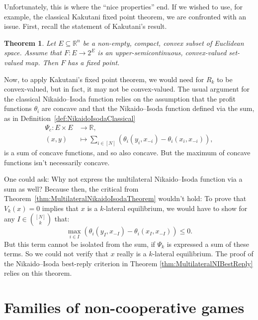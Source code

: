 \documentclass[a4paper,11pt,reqno,english]{amsart}
\theoremstyle{plain}
\newtheorem{theorem}{Theorem}[section]
\theoremstyle{definition}
\begin{document}
\medskip
Unfortunately, this is where the ``nice properties'' end.
If we wished to use, for example, the classical Kakutani fixed point theorem, we are confronted with an issue.
First, recall the statement of Kakutani's result.

\begin{theorem}\label{thm:KakutaniFixedPointTheorem}
	Let $E\subseteq \mathbb{R}^n$ be a non-empty, compact, convex subset of Euclidean space. Assume that $F\colon E\longrightarrow 2^E$ is an upper-semicontinuous, convex-valued set-valued map. Then $F$ has a fixed point.
\end{theorem}

Now, to apply Kakutani's fixed point theorem, we would need for $R_k$ to be convex-valued, but in fact, it may not be convex-valued.
The usual argument for the classical Nikaido--Isoda function relies on the assumption that the profit functions $\theta_i$ are concave and that the Nikaido--Isoda function defined via the sum, as in Definition~\ref{def:NikaidoIsodaClassical}
\begin{align*}
	\Psi_c\colon E\times E & \longrightarrow \mathbb{R} ,                                                          \\
	(x,y)                  & \longmapsto \sum_{i\in[N]} \left(\theta_i(y_i,x_{-i}) - \theta_i(x_i, x_{-i})\right),
\end{align*}
is a sum of concave functions, and so also concave.
But the maximum of concave functions isn't necessarily concave.

\medskip
One could ask: Why not express the multilateral Nikaido--Isoda function via a sum as well?
Because then, the critical from Theorem~\ref{thm:MultilateralNikaidoIsodaTheorem} wouldn't hold: To prove that $V_k(x)=0$ implies that $x$ is a $k$-lateral equilibrium, we would have to show for any $I\in\binom{[N]}{k}$ that:
\[
	\max_{i\in I}\left(\theta_i(y_I, x_{-I}) - \theta_i(x_I, x_{-I})\right) \leq 0.
\]
But this term cannot be isolated from the sum, if $\Psi_k$ is expressed a sum of these terms. So we could not verify that $x$ really is a $k$-lateral equilibrium. The proof of the Nikaido--Isoda best-reply criterion in Theorem \ref{thm:MultilateralNIBestReply} relies on this theorem.

 

\part{Families of non-cooperative games}
\end{document}
